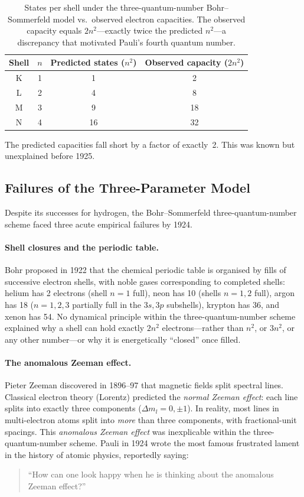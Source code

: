 \documentclass[12pt]{article}
\begin{document}
\begin{table}[ht]
\centering
\caption{States per shell under the three-quantum-number
Bohr--Sommerfeld model vs.\ observed electron capacities.
The observed capacity equals $2n^2$---exactly twice the predicted
$n^2$---a discrepancy that motivated Pauli's fourth quantum number.}
\label{tab:three_param}
\medskip
\begin{tabular}{cccc}
\toprule
Shell & $n$ & Predicted states ($n^2$) & Observed capacity ($2n^2$) \\
\midrule
K & 1 &  1 &  2 \\
L & 2 &  4 &  8 \\
M & 3 &  9 & 18 \\
N & 4 & 16 & 32 \\
\bottomrule
\end{tabular}
\end{table}

\noindent The predicted capacities fall short by a factor of exactly~2.
This was known but unexplained before 1925.

\subsection{Failures of the Three-Parameter Model}

Despite its successes for hydrogen, the Bohr--Sommerfeld three-quantum-number
scheme faced three acute empirical failures by 1924.

\paragraph{Shell closures and the periodic table.}
Bohr proposed in 1922 that the chemical periodic table is organised by fills
of successive electron shells, with noble gases corresponding to completed
shells: helium has 2 electrons (shell $n=1$ full), neon has 10 (shells $n=1,2$
full), argon has 18 ($n=1,2,3$ partially full in the $3s,3p$ subshells), krypton
has 36, and xenon has 54.  No dynamical principle within the
three-quantum-number scheme explained why a shell can hold exactly $2n^2$
electrons---rather than $n^2$, or $3n^2$, or any other number---or why it is
energetically ``closed'' once filled.

\paragraph{The anomalous Zeeman effect.}
Pieter Zeeman discovered in 1896--97 \citep{Zeeman1897} that magnetic fields
split spectral lines.  Classical electron theory (Lorentz) predicted the
\emph{normal Zeeman effect}: each line splits into exactly three components
($\Delta m_l = 0,\pm 1$).  In reality, most lines in multi-electron atoms
split into \emph{more} than three components, with fractional-unit spacings.
This \emph{anomalous Zeeman effect} was inexplicable within the
three-quantum-number scheme.  Pauli in 1924 wrote the most famous frustrated
lament in the history of atomic physics, reportedly saying:
\begin{quote}
  ``How can one look happy when he is thinking about the anomalous Zeeman
  effect?'' \citep{Pais1991}
\end{quote}
\end{document}
